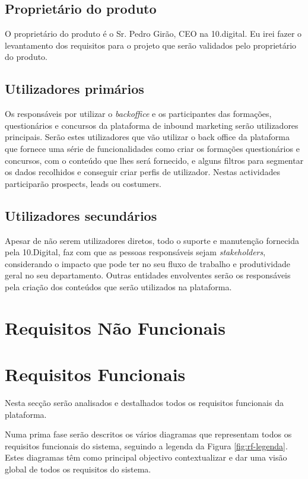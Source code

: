 \subsection{Proprietário do produto}

O proprietário do produto é o Sr. Pedro Girão, CEO na 10.digital. Eu irei fazer o levantamento dos requisitos para o projeto que serão validados pelo proprietário do produto.

\subsection{Utilizadores primários}

Os responsáveis por utilizar o \textit{backoffice} e os participantes das formações, questionários e concursos da plataforma de inbound marketing serão utilizadores principais. Serão estes utilizadores que vão utilizar o back office da plataforma que fornece uma série de funcionalidades como criar os formações questionários e concursos, com o conteúdo que lhes será fornecido, e alguns filtros para segmentar os dados recolhidos e conseguir criar perfis de utilizador. Nestas actividades participarão prospects, leads ou costumers.


\subsection{Utilizadores secundários}

Apesar de não serem utilizadores diretos, todo o suporte e manutenção fornecida pela 10.Digital, faz com que as pessoas responsáveis sejam \textit{stakeholders}, considerando o impacto que pode ter no seu fluxo de trabalho e produtividade geral no seu departamento. 
Outras entidades envolventes serão os responsáveis pela criação dos conteúdos que serão utilizados na plataforma.


\section{Requisitos Não Funcionais}
\label{rnf}


\section{Requisitos Funcionais}
\label{rf}

Nesta secção serão analisados e destalhados todos os requisitos funcionais da plataforma.

Numa prima fase serão descritos os vários diagramas que representam todos os requisitos funcionais do sistema, seguindo a legenda da Figura \ref{fig:rf-legenda}. Estes diagramas têm como principal objectivo contextualizar e dar uma visão global de todos os requisitos do sistema. 

